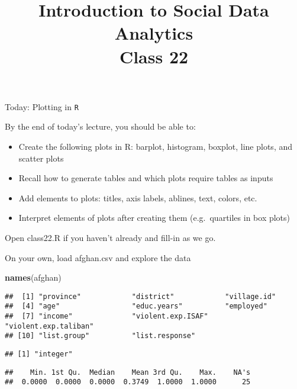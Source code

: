 \documentclass[ignorenonframetext,]{beamer}
\title[Class 22]{Introduction to Social Data Analytics\\
	Class 22}
\author[]{}
\institute[UCSD]{}
\date[]{}
\newenvironment{Shaded}{\begin{snugshade}}{\end{snugshade}}
\newcommand{\KeywordTok}[1]{\textcolor[rgb]{0.13,0.29,0.53}{\textbf{#1}}}
\newcommand{\OperatorTok}[1]{\textcolor[rgb]{0.81,0.36,0.00}{\textbf{#1}}}
\newcommand{\NormalTok}[1]{#1}
\providecommand{\tightlist}{%
	\setlength{\itemsep}{0pt}\setlength{\parskip}{0pt}}
\begin{document}
\frame{\titlepage}

\begin{frame}{Today: Plotting in \texttt{R}}

By the end of today's lecture, you should be able to:

\begin{itemize}
\tightlist
\item
  Create the following plots in R: barplot, histogram, boxplot, line
  plots, and scatter plots
\item
  Recall how to generate tables and which plots require tables as inputs
\item
  Add elements to plots: titles, axis labels, ablines, text, colors,
  etc.
\item
  Interpret elements of plots after creating them (e.g.~quartiles in box
  plots)
\end{itemize}

Open class22.R if you haven't already and fill-in as we go.

\end{frame}

\begin{frame}[fragile]{On your own, load afghan.csv and explore the
data}

\begin{Shaded}
\begin{Highlighting}[]
\KeywordTok{names}\NormalTok{(afghan)}
\end{Highlighting}
\end{Shaded}

\begin{verbatim}
##  [1] "province"            "district"            "village.id"         
##  [4] "age"                 "educ.years"          "employed"           
##  [7] "income"              "violent.exp.ISAF"    "violent.exp.taliban"
## [10] "list.group"          "list.response"
\end{verbatim}

\begin{Shaded}
\end{Shaded}

\begin{verbatim}
## [1] "integer"
\end{verbatim}

\begin{Shaded}
\end{Shaded}

\begin{verbatim}
##    Min. 1st Qu.  Median    Mean 3rd Qu.    Max.    NA's 
##  0.0000  0.0000  0.0000  0.3749  1.0000  1.0000      25
\end{verbatim}

\end{frame}
\end{document}

